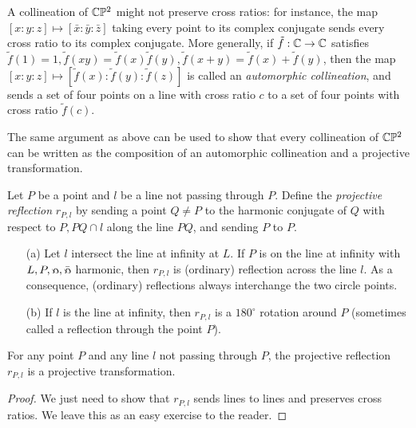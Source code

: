 \begin{rem} A collineation of $\mathbb{C}\mathbb{P}^2$ might not preserve cross ratios: for instance, the map $[x:y:z] \mapsto [\bar{x}:\bar{y}:\bar{z}]$ taking every point to its complex conjugate sends every cross ratio to its complex conjugate. More generally, if $\tilde{f}:\mathbb{C}\rightarrow\mathbb{C}$ satisfies $\tilde{f}(1) = 1, \tilde{f}(xy) = \tilde{f}(x)\tilde{f}(y), \tilde{f}(x+y) = \tilde{f}(x)+\tilde{f}(y)$, then the map $[x:y:z] \mapsto [\tilde{f}(x):\tilde{f}(y):\tilde{f}(z)]$ is called an \emph{automorphic collineation}, and sends a set of four points on a line with cross ratio $c$ to a set of four points with cross ratio $\tilde{f}(c)$.

The same argument as above can be used to show that every collineation of $\mathbb{C}\mathbb{P}^2$ can be written as the composition of an automorphic collineation and a projective transformation.
\end{rem}

\begin{defn} Let $P$ be a point and $l$ be a line not passing through $P$. Define the \emph{projective reflection} $r_{P,l}$ by sending a point $Q \ne P$ to the harmonic conjugate of $Q$ with respect to $P, PQ \cap l$ along the line $PQ$, and sending $P$ to $P$.
\end{defn}

\begin{ex}
\begin{itemize}
\item[(a)] Let $l$ intersect the line at infinity at $L$. If $P$ is on the line at infinity with $L,P,\fish,\bar\fish$ harmonic, then $r_{P,l}$ is (ordinary) reflection across the line $l$. As a consequence, (ordinary) reflections always interchange the two circle points.

\item[(b)] If $l$ is the line at infinity, then $r_{P,l}$ is a $180^\circ$ rotation around $P$ (sometimes called a reflection through the point $P$).
\end{itemize}
\end{ex}

\begin{thm} For any point $P$ and any line $l$ not passing through $P$, the projective reflection $r_{P,l}$ is a projective transformation.
\end{thm}
\begin{proof} We just need to show that $r_{P,l}$ sends lines to lines and preserves cross ratios. We leave this as an easy exercise to the reader.
\end{proof}


